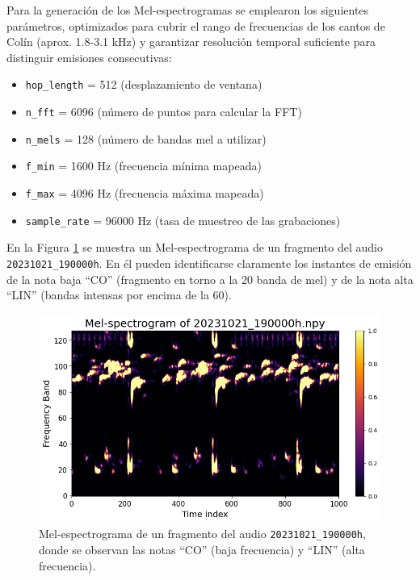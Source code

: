 Para la generación de los Mel-espectrogramas se emplearon los 
siguientes parámetros, optimizados para cubrir el rango de 
frecuencias de los cantos de Colín (aprox. 1.8-3.1 kHz) \cite{alonso2001llamadas} 
y garantizar resolución temporal suficiente para distinguir 
emisiones consecutivas:
\begin{itemize}
  \item \texttt{hop\_length} = 512 (desplazamiento de ventana)  
  \item \texttt{n\_fft} = 6096 (número de puntos para calcular la FFT)  
  \item \texttt{n\_mels} = 128 (número de bandas mel a utilizar)  
  \item \texttt{f\_min} = 1600 Hz (frecuencia mínima mapeada)  
  \item \texttt{f\_max} = 4096 Hz (frecuencia máxima mapeada)  
  \item \texttt{sample\_rate} = 96000 Hz (tasa de muestreo de las grabaciones)  
\end{itemize}

En la Figura \ref{fig:mel_example} se muestra un 
Mel-espectrograma de un fragmento del audio 
\texttt{20231021\_190000h}. En él pueden identificarse 
claramente los instantes de emisión de la nota baja “CO” 
(fragmento en torno a la 20 banda de mel) y de la nota alta “LIN” 
(bandas intensas por encima de la 60).

\begin{figure}[ht]
  \centering
  \includegraphics[width=0.9\linewidth]{Graphics/mel-spectrogram.png}
  \caption{Mel-espectrograma de un fragmento del audio \texttt{20231021\_190000h}, donde se observan las notas “CO” (baja frecuencia) y “LIN” (alta frecuencia).}
  \label{fig:mel_example}
\end{figure}





